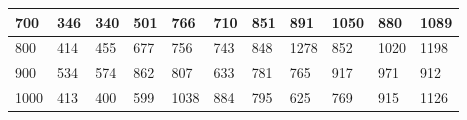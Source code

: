 \documentclass[10pt,letterpaper]{article}
\begin{document}
\begin{center}
\begin{table}
\begin{tabular} { |m{0.5cm}|m{1.3cm}|m{1.3cm}|m{1.3cm}|m{1.3cm}|m{1.3cm}|m{1.3cm}|m{1.3cm}|m{1.3cm}|m{1.3cm}|m{1.3cm}|}
\hline
\cellcolor{Gray}700 & \Large 346 & \Large 340 & \Large 501 & \Large 766 & \Large 710 & \Large 851 & \Large 891 & \Large 1050 & \Large 880 & \Large 1089 \\
\hline
\cellcolor{Gray}800 & \Large 414 & \Large 455 & \Large 677 & \Large 756 & \Large 743 & \Large 848 & \Large 1278 & \Large 852 & \Large 1020 & \Large 1198 \\
\hline
\cellcolor{Gray}900 & \Large 534 & \Large 574 & \Large 862 & \Large 807 & \Large 633 & \Large 781 & \Large 765 & \Large 917 & \Large 971 & \Large 912 \\
\hline
\cellcolor{Gray}1000 & \Large 413 & \Large 400 & \Large 599 & \Large 1038 & \Large 884 & \Large 795 & \Large 625 & \Large 769 & \Large 915 & \Large 1126 \\
\hline
\end{tabular} \\
\end{table}
\end{center}
\newpage 
{}
\end{document}
